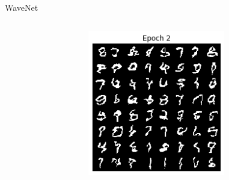 \begin{frame}[allowframebreaks]{WaveNet}
\begin{columns}
\begin{column}{0.18\linewidth}
\begin{figure}
            \end{figure}
        \end{column}
        \begin{column}{0.18\linewidth}
            \begin{figure}
                \centering
                \includegraphics[width=1\linewidth]{images/autoregressive/mnist/coord-epoch-2.png}
            \end{figure}
        \end{column}
        \begin{column}{0.18\linewidth}
            \begin{figure}
                \centering

\end{figure}
\end{column}
\end{columns}
\end{frame}
